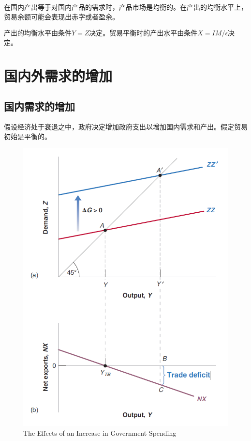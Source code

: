 \documentclass{article}
\begin{document}
在国内产出等于对国内产品的需求时，产品市场是均衡的。在产出的均衡水平上，贸易余额可能会表现出赤字或者盈余。

产出的均衡水平由条件$ Y=Z $决定。贸易平衡时的产出水平由条件$ X=IM/\epsilon $决定。

\section{国内外需求的增加}

\subsection{国内需求的增加}

假设经济处于衰退之中，政府决定增加政府支出以增加国内需求和产出。假定贸易初始是平衡的。

\begin{figure}[H] %
	\centering %
	\includegraphics[width=1\textwidth]{18_4} %
	\caption{The Effects of an Increase
		in Government Spending} %
	\label{Fig.main5} %
\end{figure}
\end{document}
